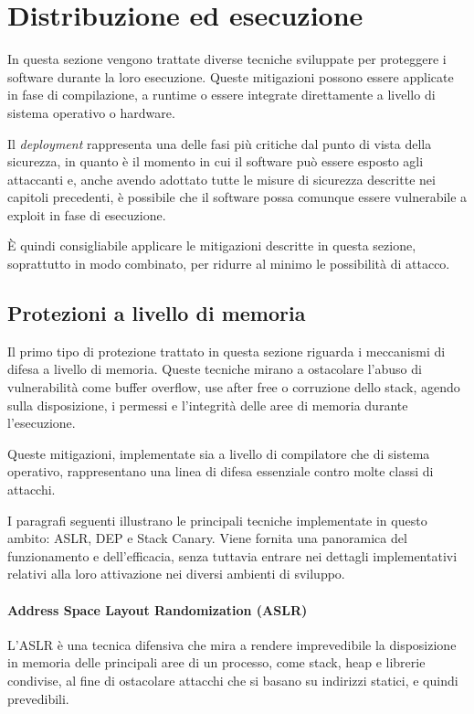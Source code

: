 \section{Distribuzione ed esecuzione}
\label{sec:deployment}

In questa sezione vengono trattate diverse tecniche sviluppate per proteggere i software
durante la loro esecuzione. Queste mitigazioni possono essere applicate in fase
di compilazione, a runtime o essere integrate direttamente a livello di sistema operativo
o hardware.

Il \textit{deployment} rappresenta una delle fasi più critiche dal punto di
vista della sicurezza, in quanto è il momento in cui il software può essere esposto
agli attaccanti e, anche avendo adottato tutte le misure di sicurezza descritte
nei capitoli precedenti, è possibile che il software possa comunque essere vulnerabile
a exploit in fase di esecuzione.

È quindi consigliabile applicare le mitigazioni descritte in questa sezione,
soprattutto in modo combinato, per ridurre al minimo le possibilità di attacco.

\subsection{Protezioni a livello di memoria}
\label{sec:memory-protection}

Il primo tipo di protezione trattato in questa sezione riguarda i meccanismi di
difesa a livello di memoria. Queste tecniche mirano a ostacolare l'abuso di vulnerabilità
come buffer overflow, use after free o corruzione dello stack, agendo sulla disposizione,
i permessi e l'integrità delle aree di memoria durante l'esecuzione.

Queste mitigazioni, implementate sia a livello di compilatore che di sistema operativo,
rappresentano una linea di difesa essenziale contro molte classi di attacchi.

I paragrafi seguenti illustrano le principali tecniche implementate in questo
ambito: ASLR, DEP e Stack Canary. Viene fornita una panoramica del funzionamento
e dell'efficacia, senza tuttavia entrare nei dettagli implementativi relativi
alla loro attivazione nei diversi ambienti di sviluppo.

\paragraph{Address Space Layout Randomization (ASLR)}
L'ASLR è una tecnica difensiva che mira a rendere imprevedibile la disposizione in
memoria delle principali aree di un processo, come stack, heap e librerie condivise,
al fine di ostacolare attacchi che si basano su indirizzi statici, e quindi prevedibili.

